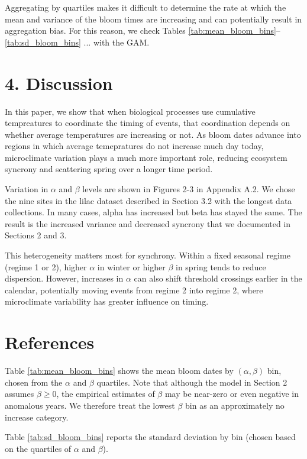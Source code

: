 Aggregating by quartiles makes it difficult to determine the rate at
which the mean and variance of the bloom times are increasing and can
potentially result in aggregation bias. For this reason, we check Tables
\ref{tab:mean_bloom_bins}--\ref{tab:sd_bloom_bins} ... with the GAM.  

\section{4. Discussion}\label{discussion}

In this paper, we show that when biological processes use cumulative
tempreatures to coordinate the timing of events, that coordination
depends on whether average temperatures are increasing or not. As bloom
dates advance into regions in which average temepratures do not increase
much day today, microclimate variation plays a much more important role,
reducing ecosystem syncrony and scattering spring over a longer time
period.



Variation in \(\alpha\) and \(\beta\) levels are shown in Figures 2-3 in
Appendix A.2. We chose the nine sites in the lilac dataset described in
Section 3.2 with the longest data collections. In many cases, alpha has
increased but beta has stayed the same. The result is the increased
variance and decreased syncrony that we documented in Sections 2 and 3.

This heterogeneity matters most for synchrony. Within a fixed seasonal
regime (regime 1 or 2), higher \(\alpha\) in winter or higher \(\beta\)
in spring tends to reduce dispersion. However, increases in \(\alpha\)
can also shift threshold crossings earlier in the calendar, potentially
moving events from regime 2 into regime 2, where microclimate
variability has greater influence on timing. 
\section{References}\label{references}




 Table \ref{tab:mean_bloom_bins}
shows the mean bloom dates by \((\alpha,\beta)\) bin, chosen from the
\(\alpha\) and \(\beta\) quartiles. Note that although the model in
Section 2 assumes \(\beta\ge 0\), the empirical estimates of \(\beta\)
may be near-zero or even negative in anomalous years. We therefore treat
the lowest \(\beta\) bin as an approximately no increase category.

Table \ref{tab:sd_bloom_bins} reports the standard deviation by bin
(chosen based on the quartiles of \(\alpha\) and \(\beta\)). 


